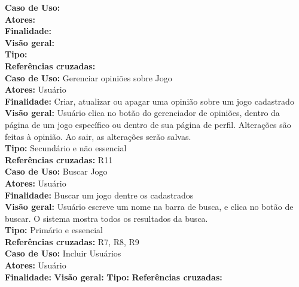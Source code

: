 \textbf{Caso de Uso:} \\
\textbf{Atores:} \\
\textbf{Finalidade:} \\
\textbf{Visão geral:} \\
\textbf{Tipo:} \\
\textbf{Referências cruzadas:} \\


\textbf{Caso de Uso:} Gerenciar opiniões sobre Jogo \\
\textbf{Atores:} Usuário \\
\textbf{Finalidade:} Criar, atualizar ou apagar uma opinião sobre um jogo cadastrado \\
\textbf{Visão geral:} Usuário clica no botão do gerenciador de opiniões, dentro
da página de um jogo específico ou dentro de sua página de perfil. Alterações são
feitas à opinião. Ao sair, as alterações serão salvas. \\
\textbf{Tipo:} Secundário e não essencial \\
\textbf{Referências cruzadas:} R11 \\


\textbf{Caso de Uso:} Buscar Jogo \\
\textbf{Atores:} Usuário \\
\textbf{Finalidade:} Buscar um jogo dentre os cadastrados \\
\textbf{Visão geral:} Usuário escreve um nome na barra de busca, e clica no botão
de buscar. O sistema mostra todos os resultados da busca. \\
\textbf{Tipo:} Primário e essencial \\
\textbf{Referências cruzadas:} R7, R8, R9 \\


\textbf{Caso de Uso:} Incluir Usuários \\
\textbf{Atores:} Usuário \\
\textbf{Finalidade:} 
\textbf{Visão geral:}
\textbf{Tipo:}
\textbf{Referências cruzadas:}
